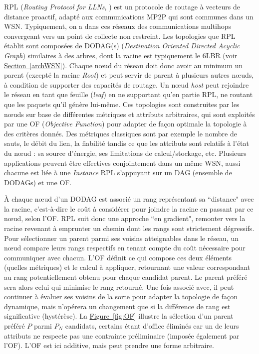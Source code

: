 \documentclass[]{report}
\newcommand{\wordlink}[2]{\hyperref[#2]{#1~\ref{#2}}}
\begin{document}
\par RPL (\textit{Routing Protocol for LLNs}, \cite{rfc6550}) est un protocole de routage à vecteurs de distance proactif, adapté aux communications MP2P qui sont communes dans un WSN. Typiquement, on a dans ces réseaux des communications multihops convergeant vers un point de collecte non restreint. Les topologies que RPL établit sont composées de DODAG(s) (\textit{Destination Oriented Directed Acyclic Graph}) similaires à des arbres, dont la racine est typiquement le 6LBR (voir \wordlink{Section}{archWSN}). Chaque nœud du réseau doit donc avoir au minimum un parent (excepté la racine \textit{Root}) et peut servir de parent à plusieurs autres nœuds, à condition de supporter des capacités de routage. Un nœud \textit{host} peut rejoindre le réseau en tant que feuille (\textit{leaf}) en ne supportant qu'en partie RPL, ne routant que les paquets qu'il génère lui-même. Ces topologies sont construites par les nœuds sur base de différentes métriques et attributs arbitraires, qui sont exploités par une OF (\textit{Objective Function}) pour adapter de façon optimale la topologie à des critères donnés. Des métriques classiques sont par exemple le nombre de sauts, le débit du lien, la fiabilité tandis ce que les attributs sont relatifs à l'état du nœud : sa source d'énergie, ses limitations de calcul/stockage, etc. Plusieurs applications peuvent être effectives conjointement dans un même WSN, aussi chacune est liée à une \textit{Instance} RPL s'appuyant sur un DAG (ensemble de DODAGs) et une OF.\\

\par À chaque nœud d'un DODAG est associé un rang représentant sa ``distance" avec la racine, c'est-à-dire le coût à considérer pour joindre la racine en passant par ce nœud, selon l'OF. RPL suit donc une approche ``en gradient", remonter vers la racine revenant à emprunter un chemin dont les rangs sont strictement dégressifs. Pour sélectionner un parent parmi ses voisins atteignables dans le réseau, un nœud compare leurs rangs respectifs en tenant compte du coût nécessaire pour communiquer avec chacun. L'OF définit ce qui compose ces deux éléments (quelles métriques) et le calcul à appliquer, retournant une valeur correspondant au rang potentiellement obtenu pour chaque candidat parent. Le parent préféré sera alors celui qui minimise le rang retourné. Une fois associé avec, il peut continuer à évaluer ses voisins de la sorte pour adapter la topologie de façon dynamique, mais n'opérera un changement que si la différence de rang est significative (hystérèse). La \wordlink{Figure}{fig:OF} illustre la sélection d'un parent préféré $P$ parmi $P_N$ candidats, certains étant d'office éliminés car un de leurs attributs ne respecte pas une contrainte préliminaire (imposée également par l'OF). L'OF est ici additive, mais peut prendre une forme arbitraire.
\end{document}
